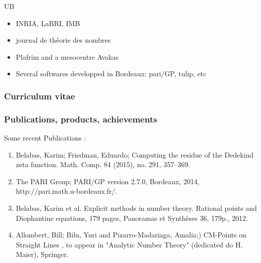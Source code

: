 \begin{sitedescription}{UB}


\begin{itemize}
\item INRIA, LaBRI, IMB
\item journal de th\'eorie des nombres
\item Plafrim and a mesocentre Avakas
\item Several softwares developped in Bordeaux: pari/GP, tulip, etc
\end{itemize}


\subsubsection*{Curriculum vitae}



%




\subsubsection*{Publications, products, achievements}

Some recent Publications :
\begin{enumerate}
\item 
Belabas, Karim; Friedman, Eduardo; Computing the residue of the Dedekind
zeta function.  Math. Comp. 84 (2015), no. 291, 357–369. 

\item
The PARI Group; PARI/GP version 2.7.0, Bordeaux, 2014,
http://pari.math.u-bordeaux.fr/.

\item
Belabas, Karim et al. Explicit methods in number theory. Rational points and
Diophantine equations, 179 pages, Panoramas et Synthèses 36, 179p., 2012.

\item
Allombert, Bill; Bilu, Yuri and Pizarro-Madariaga, Amalia;) CM-Points on
Straight Lines , to appear in "Analytic Number Theory" (dedicated do H. Maier),
Springer. 
\end{enumerate}




\end{sitedescription}
